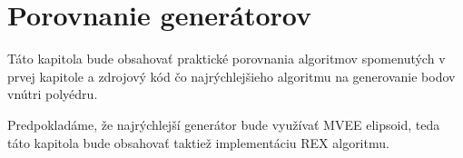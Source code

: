 \chapter{Porovnanie generátorov}

Táto kapitola bude obsahovať praktické porovnania algoritmov spomenutých v prvej kapitole a zdrojový kód čo najrýchlejšieho algoritmu na generovanie bodov vnútri polyédru.

Predpokladáme, že najrýchlejší generátor bude využívať MVEE elipsoid, teda táto kapitola bude obsahovať taktiež implementáciu REX algoritmu.\\


